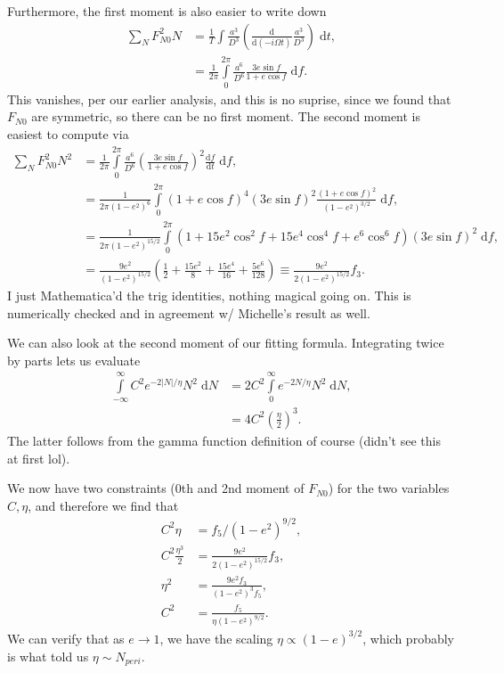 \documentclass[11pt,
        usenames, %
        dvipsnames %
    ]{article}
\newcommand*{\rd}[2]{\frac{\mathrm{d}#1}{\mathrm{d}#2}}
\newcommand*{\abs}[1]{\left|#1\right|}
\newcommand*{\p}[1]{\left(#1\right)}
\begin{document}
Furthermore, the first moment is also easier to write down
\begin{align}
    \sum\limits_N F_{N0}^2N
        &= \frac{1}{T} \int\limits \frac{a^3}{D^3}
            \p{\rd{}{\p{-i \Omega t}} \frac{a^3}{D^3}}\;\mathrm{d}t,\\
        &= \frac{1}{2\pi}\int\limits_0^{2\pi}
            \frac{a^6}{D^6} \frac{3e\sin f}{1 + e \cos f} \;\mathrm{d}f.
\end{align}
This vanishes, per our earlier analysis, and this is no suprise, since we found
that $F_{N0}$ are symmetric, so there can be no first moment. The second moment
is easiest to compute via
\begin{align}
    \sum\limits_N F_{N0}^2N^2
        &= \frac{1}{2\pi}\int\limits_0^{2\pi}
            \frac{a^6}{D^6} \p{\frac{3e\sin f}{1 + e \cos f}}^2
                \rd{f}{t}\;\mathrm{d}f
                ,\\
        &= \frac{1}{2\pi\p{1 - e^2}^6}\int\limits_0^{2\pi}
            \p{1 + e\cos f}^4\p{3e\sin f}^2
                \frac{\p{1 + e \cos f}^2}{\p{1 - e^2}^{3/2}}\;\mathrm{d}f,\\
        &= \frac{1}{2\pi\p{1 - e^2}^{15/2}}\int\limits_0^{2\pi}
            \p{1 + 15e^2\cos^2f + 15e^4\cos^4f
                + e^6\cos^6 f}\p{3e\sin f}^2\;\mathrm{d}f,\\
        &= \frac{9e^2}{\p{1 - e^2}^{15/2}}\p{
            \frac{1}{2} + \frac{15e^2}{8} + \frac{15e^4}{16}
                + \frac{5e^6}{128}}
            \equiv \frac{9e^2}{2\p{1 - e^2}^{15/2}}f_3.
\end{align}
I just Mathematica'd the trig identities, nothing magical going on. This is
numerically checked and in agreement w/ Michelle's result as well.

We can also look at the second moment of our fitting formula. Integrating twice
by parts lets us evaluate
\begin{align}
    \int\limits_{-\infty}^\infty C^2e^{-2\abs{N} / \eta} N^2\;\mathrm{d}N
        &= 2C^2\int\limits_0^\infty e^{-2N/\eta}N^2\;\mathrm{d}N,\\
        &= 4C^2\p{\frac{\eta}{2}}^3.
\end{align}
The latter follows from the gamma function definition of course (didn't see this
at first lol).

We now have two constraints (0th and 2nd moment of $F_{N0}$) for the two
variables $C, \eta$, and therefore we find that
\begin{align}
    C^2\eta &= f_5 / \p{1 - e^2}^{9/2},\\
    C^2 \frac{\eta^3}{2} &= \frac{9e^2}{2\p{1 - e^2}^{15/2}}f_3,\\
    \eta^2 &= \frac{9e^2f_3}{\p{1 - e^2}^{3}f_5},\\
    C^2 &= \frac{f_5}{\eta\p{1 - e^2}^{9/2}}.
\end{align}
We can verify that as $e \to 1$, we have the scaling $\eta \propto \p{1 -
e}^{3/2}$, which probably is what told us $\eta \sim N_{peri}$.
\end{document}
